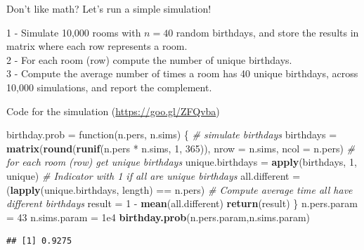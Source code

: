 \documentclass[ignorenonframetext,]{beamer}
\newenvironment{Shaded}{\begin{snugshade}}{\end{snugshade}}
\newcommand{\KeywordTok}[1]{\textcolor[rgb]{0.13,0.29,0.53}{\textbf{{#1}}}}
\newcommand{\DataTypeTok}[1]{\textcolor[rgb]{0.13,0.29,0.53}{{#1}}}
\newcommand{\DecValTok}[1]{\textcolor[rgb]{0.00,0.00,0.81}{{#1}}}
\newcommand{\FloatTok}[1]{\textcolor[rgb]{0.00,0.00,0.81}{{#1}}}
\newcommand{\StringTok}[1]{\textcolor[rgb]{0.31,0.60,0.02}{{#1}}}
\newcommand{\CommentTok}[1]{\textcolor[rgb]{0.56,0.35,0.01}{\textit{{#1}}}}
\newcommand{\NormalTok}[1]{{#1}}
\begin{document}
\begin{frame}{Don't like math? Let's run a simple simulation!}

1 - Simulate 10,000 rooms with \(n = 40\) random birthdays, and store
the results in matrix where each row represents a room.\\
2 - For each room (row) compute the number of unique birthdays.\\
3 - Compute the average number of times a room has 40 unique birthdays,
across 10,000 simulations, and report the complement.

\end{frame}

\begin{frame}[fragile]{Code for the simulation
(\url{https://goo.gl/ZFQvba})}

\begin{Shaded}
\begin{Highlighting}[]
\NormalTok{birthday.prob =}\StringTok{ }\NormalTok{function(n.pers, n.sims) \{}
  \CommentTok{# simulate birthdays}
  \NormalTok{birthdays =}\StringTok{ }\KeywordTok{matrix}\NormalTok{(}\KeywordTok{round}\NormalTok{(}\KeywordTok{runif}\NormalTok{(n.pers *}\StringTok{ }\NormalTok{n.sims, }\DecValTok{1}\NormalTok{, }\DecValTok{365}\NormalTok{)), }
                      \DataTypeTok{nrow =} \NormalTok{n.sims, }\DataTypeTok{ncol =} \NormalTok{n.pers)}
  \CommentTok{# for each room (row) get unique birthdays}
  \NormalTok{unique.birthdays =}\StringTok{ }\KeywordTok{apply}\NormalTok{(birthdays, }\DecValTok{1}\NormalTok{, unique)}
  \CommentTok{# Indicator with 1 if all are unique birthdays}
  \NormalTok{all.different =}\StringTok{ }\NormalTok{(}\KeywordTok{lapply}\NormalTok{(unique.birthdays, length) ==}\StringTok{ }\NormalTok{n.pers)}
  \CommentTok{# Compute average time all have different birthdays }
  \NormalTok{result =}\StringTok{ }\DecValTok{1} \NormalTok{-}\StringTok{ }\KeywordTok{mean}\NormalTok{(all.different)}
\KeywordTok{return}\NormalTok{(result)}
\NormalTok{\}}
\NormalTok{n.pers.param =}\StringTok{ }\DecValTok{43}
\NormalTok{n.sims.param =}\StringTok{ }\FloatTok{1e4}
\KeywordTok{birthday.prob}\NormalTok{(n.pers.param,n.sims.param)}
\end{Highlighting}
\end{Shaded}

\begin{verbatim}
## [1] 0.9275
\end{verbatim}

\end{frame}
\end{document}
